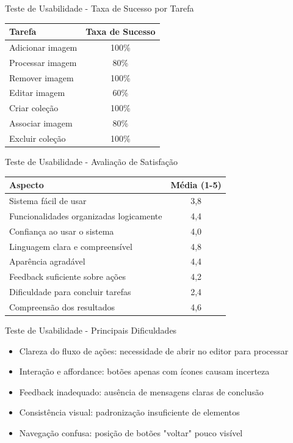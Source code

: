 \documentclass[landscape, 12pt]{beamer}
\begin{document}
\begin{frame}{Teste de Usabilidade - Taxa de Sucesso por Tarefa}
    \begin{center}
        \begin{tabular}{|l|c|}
            \hline
            \textbf{Tarefa} & \textbf{Taxa de Sucesso} \\
            \hline
            Adicionar imagem & 100\% \\
            Processar imagem & 80\% \\
            Remover imagem & 100\% \\
            Editar imagem & 60\% \\
            Criar coleção & 100\% \\
            Associar imagem & 80\% \\
            Excluir coleção & 100\% \\
            \hline
        \end{tabular}
    \end{center}
\end{frame}

\begin{frame}{Teste de Usabilidade - Avaliação de Satisfação}
    \begin{center}
        \begin{tabular}{|l|c|}
            \hline
            \textbf{Aspecto} & \textbf{Média (1-5)} \\
            \hline
            Sistema fácil de usar & 3,8 \\
            Funcionalidades organizadas logicamente & 4,4 \\
            Confiança ao usar o sistema & 4,0 \\
            Linguagem clara e compreensível & 4,8 \\
            Aparência agradável & 4,4 \\
            Feedback suficiente sobre ações & 4,2 \\
            Dificuldade para concluir tarefas & 2,4 \\
            Compreensão dos resultados & 4,6 \\
            \hline
        \end{tabular}
    \end{center}
\end{frame}

\begin{frame}{Teste de Usabilidade - Principais Dificuldades}
    \begin{itemize}
        \item Clareza do fluxo de ações: necessidade de abrir no editor para processar
        \item Interação e affordance: botões apenas com ícones causam incerteza
        \item Feedback inadequado: ausência de mensagens claras de conclusão
        \item Consistência visual: padronização insuficiente de elementos
        \item Navegação confusa: posição de botões "voltar" pouco visível
    \end{itemize}
\end{frame}
\end{document}
